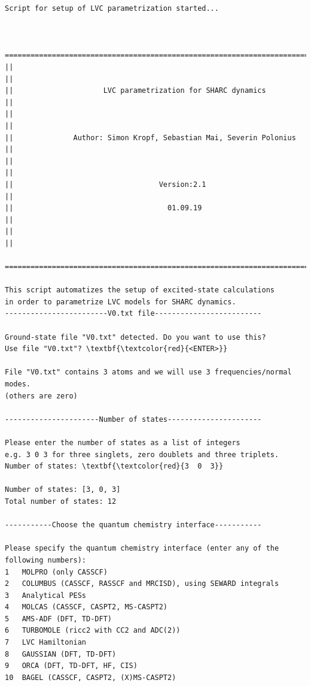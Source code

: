 \documentclass[a4paper,11pt,DIV=15,openany]{scrbook}
\begin{document}
\begin{oframed}
\footnotesize\begin{Verbatim}[commandchars=\\\{\}]
  Script for setup of LVC parametrization started...


  ================================================================================
||                                                                                ||
||                     LVC parametrization for SHARC dynamics                     ||
||                                                                                ||
||              Author: Simon Kropf, Sebastian Mai, Severin Polonius              ||
||                                                                                ||
||                                  Version:2.1                                   ||
||                                    01.09.19                                    ||
||                                                                                ||
  ================================================================================

This script automatizes the setup of excited-state calculations
in order to parametrize LVC models for SHARC dynamics.
------------------------V0.txt file-------------------------

Ground-state file "V0.txt" detected. Do you want to use this?
Use file "V0.txt"? \textbf{\textcolor{red}{<ENTER>}}

File "V0.txt" contains 3 atoms and we will use 3 frequencies/normal modes.
(others are zero)

----------------------Number of states----------------------

Please enter the number of states as a list of integers
e.g. 3 0 3 for three singlets, zero doublets and three triplets.
Number of states: \textbf{\textcolor{red}{3  0  3}}

Number of states: [3, 0, 3]
Total number of states: 12

-----------Choose the quantum chemistry interface-----------

Please specify the quantum chemistry interface (enter any of the following numbers):
1	MOLPRO (only CASSCF)
2	COLUMBUS (CASSCF, RASSCF and MRCISD), using SEWARD integrals
3	Analytical PESs
4	MOLCAS (CASSCF, CASPT2, MS-CASPT2)
5	AMS-ADF (DFT, TD-DFT)
6	TURBOMOLE (ricc2 with CC2 and ADC(2))
7	LVC Hamiltonian
8	GAUSSIAN (DFT, TD-DFT)
9	ORCA (DFT, TD-DFT, HF, CIS)
10	BAGEL (CASSCF, CASPT2, (X)MS-CASPT2)


\end{Verbatim}
\end{oframed}
\end{document}
